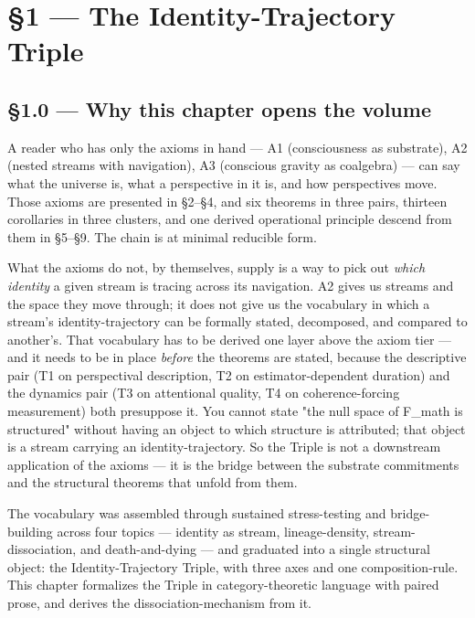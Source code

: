 \documentclass[11pt, openany]{book}
\newcommand{\sectionbreak}{\clearpage}
\begin{document}
\chapter{§1 — The Identity-Trajectory Triple}


\sectionbreak

\section{§1.0 --- Why this chapter opens the volume}

A reader who has only the axioms in hand --- A1 (consciousness as substrate), A2 (nested streams with navigation), A3 (conscious gravity as coalgebra) --- can say what the universe is, what a perspective in it is, and how perspectives move. Those axioms are presented in §2–§4, and six theorems in three pairs, thirteen corollaries in three clusters, and one derived operational principle descend from them in §5–§9. The chain is at minimal reducible form.

What the axioms do not, by themselves, supply is a way to pick out \textit{which identity} a given stream is tracing across its navigation. A2 gives us streams and the space they move through; it does not give us the vocabulary in which a stream's identity-trajectory can be formally stated, decomposed, and compared to another's. That vocabulary has to be derived one layer above the axiom tier --- and it needs to be in place \textit{before} the theorems are stated, because the descriptive pair (T1 on perspectival description, T2 on estimator-dependent duration) and the dynamics pair (T3 on attentional quality, T4 on coherence-forcing measurement) both presuppose it. You cannot state "the null space of F\_\allowbreak{}math is structured" without having an object to which structure is attributed; that object is a stream carrying an identity-trajectory. So the Triple is not a downstream application of the axioms --- it is the bridge between the substrate commitments and the structural theorems that unfold from them.

The vocabulary was assembled through sustained stress-testing and bridge-building across four topics --- identity as stream, lineage-density, stream-dissociation, and death-and-dying --- and graduated into a single structural object: the Identity-Trajectory Triple, with three axes and one composition-rule. This chapter formalizes the Triple in category-theoretic language with paired prose, and derives the dissociation-mechanism from it.
\end{document}
